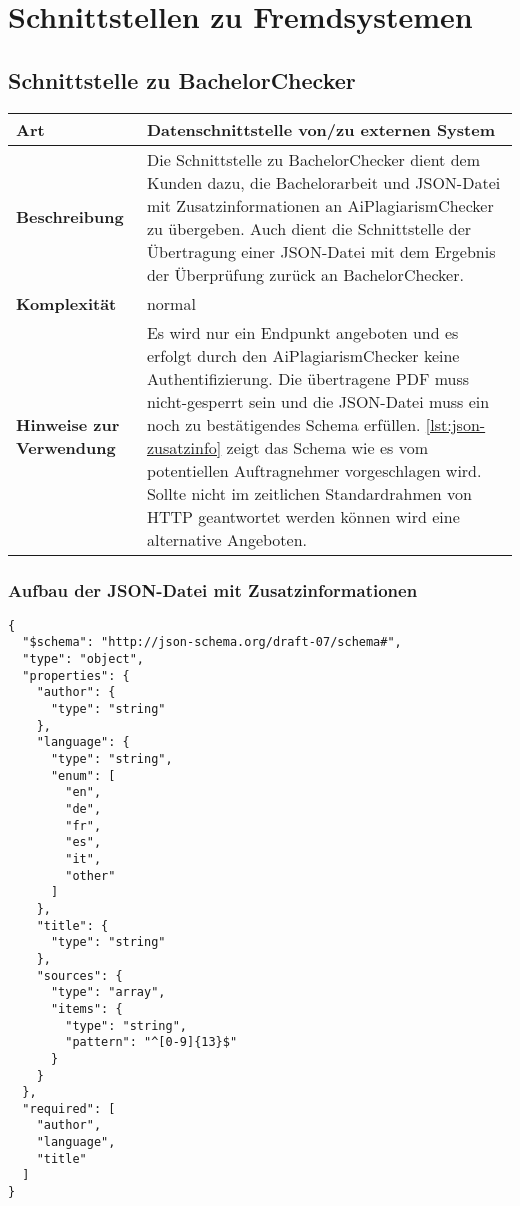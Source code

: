 \chapter{Schnittstellen zu Fremdsystemen}\label{ch:schnittstellen}


\section{Schnittstelle zu BachelorChecker}\label{sec:schnittstelle-bachelorchecker}
\begin{tabularx}{\textwidth}{l|X}
    \hline
    \textbf{Art} & Datenschnittstelle von/zu externen System \\
    \hline
    \textbf{Beschreibung} & Die Schnittstelle zu BachelorChecker dient dem Kunden dazu, die Bachelorarbeit und JSON-Datei mit Zusatzinformationen an AiPlagiarismChecker zu übergeben.
                            Auch dient die Schnittstelle der Übertragung einer JSON-Datei mit dem Ergebnis der Überprüfung zurück an BachelorChecker. \\
    \hline
    \textbf{Komplexität} & normal \\
    \hline
    \textbf{Hinweise zur Verwendung} & Es wird nur ein Endpunkt angeboten und es erfolgt durch den AiPlagiarismChecker keine Authentifizierung.
                                        Die übertragene PDF muss nicht-gesperrt sein und die JSON-Datei muss ein noch zu bestätigendes Schema erfüllen.
                                        \autoref{lst:json-zusatzinfo} zeigt das Schema wie es vom potentiellen Auftragnehmer vorgeschlagen wird.
                                        Sollte nicht im zeitlichen Standardrahmen von HTTP geantwortet werden können wird eine alternative Angeboten.\\
\end{tabularx}

\subsection{Aufbau der JSON-Datei mit Zusatzinformationen}\label{subsec:json-zusatzinfo}
\begin{lstlisting}[caption={JSON-Datei mit Zusatzinformationen},captionpos=b,label={lst:json-zusatzinfo}]
{
  "$schema": "http://json-schema.org/draft-07/schema#",
  "type": "object",
  "properties": {
    "author": {
      "type": "string"
    },
    "language": {
      "type": "string",
      "enum": [
        "en",
        "de",
        "fr",
        "es",
        "it",
        "other"
      ]
    },
    "title": {
      "type": "string"
    },
    "sources": {
      "type": "array",
      "items": {
        "type": "string",
        "pattern": "^[0-9]{13}$"
      }
    }
  },
  "required": [
    "author",
    "language",
    "title"
  ]
}
\end{lstlisting}

